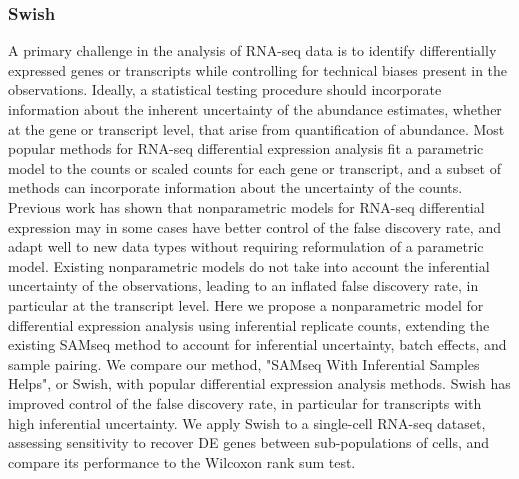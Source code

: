 \subsubsection{Swish ~\citep{zhu2019nonparametric}}
A primary challenge in the analysis of RNA-seq data is to identify differentially 
expressed genes or transcripts while controlling for technical biases present in 
the observations. Ideally, a statistical testing procedure should incorporate 
information about the inherent uncertainty of the abundance estimates, whether at 
the gene or transcript level, that arise from quantification of abundance. Most 
popular methods for RNA-seq differential expression analysis fit a parametric model 
to the counts or scaled counts for each gene or transcript, and a subset of methods 
can incorporate information about the uncertainty of the counts. Previous work has 
shown that nonparametric models for RNA-seq differential expression may in some cases 
have better control of the false discovery rate, and adapt well to new data types 
without requiring reformulation of a parametric model. Existing nonparametric models 
do not take into account the inferential uncertainty of the observations, leading to 
an inflated false discovery rate, in particular at the transcript level. Here we 
propose a nonparametric model for differential expression analysis using inferential 
replicate counts, extending the existing SAMseq method to account for inferential 
uncertainty, batch effects, and sample pairing. We compare our method, 
"SAMseq With Inferential Samples Helps", or Swish, with popular differential 
expression analysis methods. Swish has improved control of the false discovery rate, 
in particular for transcripts with high inferential uncertainty. We apply Swish to 
a single-cell RNA-seq dataset, assessing sensitivity to recover DE genes between 
sub-populations of cells, and compare its performance to the Wilcoxon rank sum test.

